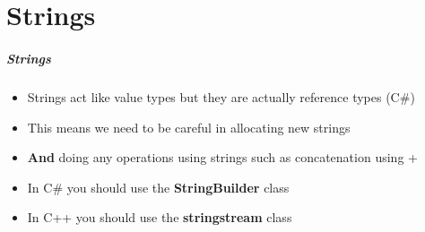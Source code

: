 \part{Strings}
\frame{\partpage}

\begin{frame}
\frametitle{Strings}
\begin{itemize}
	\item Strings act like value types but they are actually reference types (C\#)
	\item This means we need to be careful in allocating new strings
	\item \textbf{And} doing any operations using strings such as concatenation using +
	\item In C\# you should use the \textbf{StringBuilder} class 
	\item In C++ you should use the \textbf{stringstream} class
\end{itemize}
\end{frame}